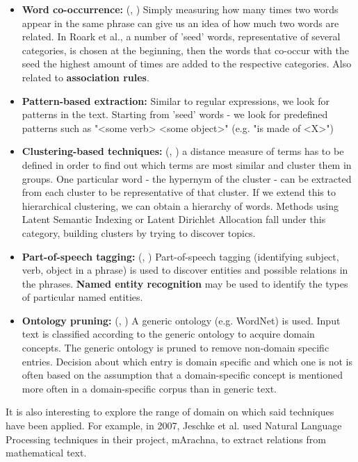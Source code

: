 \documentclass[LaM,oneside,binding=0.6cm]{sapthesis}
\begin{document}
\begin{itemize}
	\item \textbf{Word co-occurrence: } (\cite{roark_noun-phrase_2000}, \cite{yarowsky_unsupervised_1995}) Simply measuring how many times two words appear in the same phrase can give us an idea of how much two words are related. In Roark et al., a number of 'seed' words, representative of several categories, is chosen at the beginning, then the words that co-occur with the seed the highest amount of times are added to the respective categories. Also related to \textbf{association rules}.
	\item \textbf{Pattern-based extraction: } \parencite{thelen_bootstrapping_2002} Similar to regular expressions, we look for patterns in the text. Starting from 'seed' words - we look for predefined patterns such as "<some verb> <some object>" (e.g. "is made of <X>") 
	\item \textbf{Clustering-based techniques: } (\cite{schickel-zuber_using_2007}, \cite{buitelaar_corelex:_1998}) a distance measure of terms has to be defined in order to find out which terms are most similar and cluster them in groups. One particular word - the hypernym of the cluster \parencite{hearst_automatic_1992} - can be extracted from each cluster to be representative of that cluster. If we extend this to hierarchical clustering, we can obtain a hierarchy of words. Methods using Latent Semantic Indexing or Latent Dirichlet Allocation fall under this category, building clusters by trying to discover topics.
	\item \textbf{Part-of-speech tagging: } (\cite{maedche_learning_2001}, \cite{maedche_text--onto_2000}) Part-of-speech tagging (identifying subject, verb, object in a phrase) is used to discover entities and possible relations in the phrases. \textbf{Named entity recognition} may be used to identify the types of particular named entities.
	\item \textbf{Ontology pruning: } (\cite{kietz_method_2000}, \cite{volz_pruning-based_2003}) A generic ontology (e.g. WordNet) is used. Input text is classified according to the generic ontology to acquire domain concepts. The generic ontology is pruned to remove non-domain specific entries. Decision about which entry is domain specific and which one is not is often based on the assumption that a domain-specific concept is mentioned more often in a domain-specific corpus than in generic text.
\end{itemize}

It is also interesting to explore the range of domain on which said techniques have been applied. For example, in 2007, Jeschke et al. \cite{jeschke_information_2007} used Natural Language Processing techniques in their project, mArachna, to extract relations from mathematical text. \\
\end{document}
